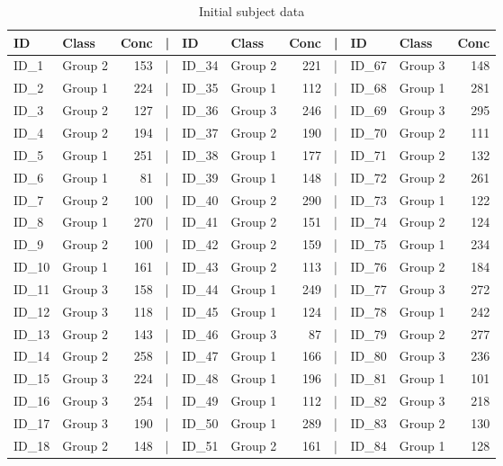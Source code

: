 \documentclass[smallextended]{svjour3}       %
\begin{document}
\begin{table}

\caption{\label{tab:show-table-1}Initial subject data}
\centering
\begin{tabular}[t]{llrlllrlllr}
\toprule
ID & Class & Conc & | & ID & Class & Conc & | & ID & Class & Conc\\
\midrule
ID\_1 & Group 2 & 153 & | & ID\_34 & Group 2 & 221 & | & ID\_67 & Group 3 & 148\\
ID\_2 & Group 1 & 224 & | & ID\_35 & Group 1 & 112 & | & ID\_68 & Group 1 & 281\\
ID\_3 & Group 2 & 127 & | & ID\_36 & Group 3 & 246 & | & ID\_69 & Group 3 & 295\\
ID\_4 & Group 2 & 194 & | & ID\_37 & Group 2 & 190 & | & ID\_70 & Group 2 & 111\\
ID\_5 & Group 1 & 251 & | & ID\_38 & Group 1 & 177 & | & ID\_71 & Group 2 & 132\\
\addlinespace
ID\_6 & Group 1 & 81 & | & ID\_39 & Group 1 & 148 & | & ID\_72 & Group 2 & 261\\
ID\_7 & Group 2 & 100 & | & ID\_40 & Group 2 & 290 & | & ID\_73 & Group 1 & 122\\
ID\_8 & Group 1 & 270 & | & ID\_41 & Group 2 & 151 & | & ID\_74 & Group 2 & 124\\
ID\_9 & Group 2 & 100 & | & ID\_42 & Group 2 & 159 & | & ID\_75 & Group 1 & 234\\
ID\_10 & Group 1 & 161 & | & ID\_43 & Group 2 & 113 & | & ID\_76 & Group 2 & 184\\
\addlinespace
ID\_11 & Group 3 & 158 & | & ID\_44 & Group 1 & 249 & | & ID\_77 & Group 3 & 272\\
ID\_12 & Group 3 & 118 & | & ID\_45 & Group 1 & 124 & | & ID\_78 & Group 1 & 242\\
ID\_13 & Group 2 & 143 & | & ID\_46 & Group 3 & 87 & | & ID\_79 & Group 2 & 277\\
ID\_14 & Group 2 & 258 & | & ID\_47 & Group 1 & 166 & | & ID\_80 & Group 3 & 236\\
ID\_15 & Group 3 & 224 & | & ID\_48 & Group 1 & 196 & | & ID\_81 & Group 1 & 101\\
\addlinespace
ID\_16 & Group 3 & 254 & | & ID\_49 & Group 1 & 112 & | & ID\_82 & Group 3 & 218\\
ID\_17 & Group 3 & 190 & | & ID\_50 & Group 1 & 289 & | & ID\_83 & Group 2 & 130\\
ID\_18 & Group 2 & 148 & | & ID\_51 & Group 2 & 161 & | & ID\_84 & Group 1 & 128\\

\end{tabular}
\end{table}
\end{document}
